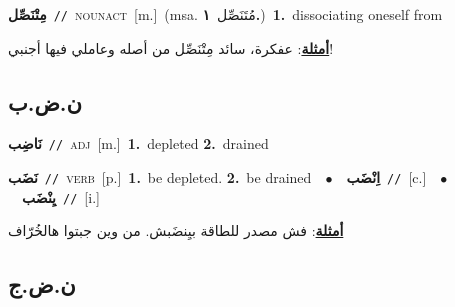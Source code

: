 \documentclass[10pt,a4paper,twoside]{article} %
\begin{document}
\begin{multicols}{2}
{\setlength\topsep{0pt}\textbf{\foreignlanguage{arabic}{مِتْنَصِّل}}\ {\color{gray}\texttt{//}\color{black}}\ \textsc{noun\textunderscore act}\ [m.]\ \color{gray}(msa. \foreignlanguage{arabic}{مُتَنَصِّل}~\foreignlanguage{arabic}{\textbf{١.}})\color{black}\ \textbf{1.}~dissociating oneself from\  \begin{flushright}\color{gray}\foreignlanguage{arabic}{\textbf{\underline{\foreignlanguage{arabic}{أمثلة}}}: عفكرة، سائد مِتْنَصِّل من أصله وعاملي فيها أجنبي!}\end{flushright}\color{black}} \vspace{2mm}

\vspace{-3mm}
\subsection*{\color{blue}\foreignlanguage{arabic}{ن.ض.ب}\color{blue}{}} 

{\setlength\topsep{0pt}\textbf{\foreignlanguage{arabic}{نَاضِب}}\ {\color{gray}\texttt{//}\color{black}}\ \textsc{adj}\ [m.]\ \textbf{1.}~depleted  \textbf{2.}~drained\ } \vspace{2mm}

{\setlength\topsep{0pt}\textbf{\foreignlanguage{arabic}{نَضَب}}\ {\color{gray}\texttt{//}\color{black}}\ \textsc{verb}\ [p.]\ \textbf{1.}~be depleted.  \textbf{2.}~be drained\ \ $\bullet$\ \ \setlength\topsep{0pt}\textbf{\foreignlanguage{arabic}{اِنْضَب}}\ {\color{gray}\texttt{//}\color{black}}\ [c.]\ \ $\bullet$\ \ \setlength\topsep{0pt}\textbf{\foreignlanguage{arabic}{يِنْضَب}}\ {\color{gray}\texttt{//}\color{black}}\ [i.]\  \begin{flushright}\color{gray}\foreignlanguage{arabic}{\textbf{\underline{\foreignlanguage{arabic}{أمثلة}}}: فش مصدر للطاقة بيِنضَبش. من وين جبتوا هالخُرّاف}\end{flushright}\color{black}} \vspace{2mm}

\vspace{-3mm}
\subsection*{\color{blue}\foreignlanguage{arabic}{ن.ض.ج}\color{blue}{}} 


\end{multicols}
\end{document}
